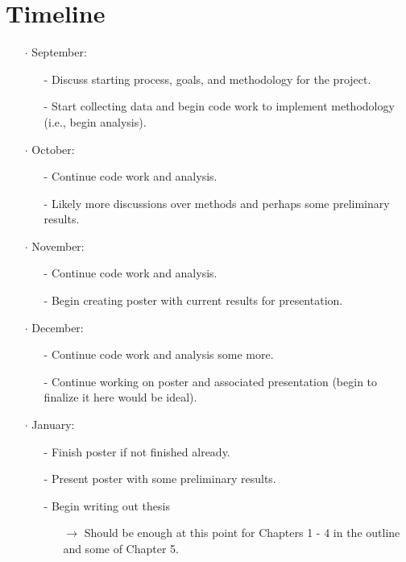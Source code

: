 \documentclass[12pt, letterpaper]{article}
\begin{document}
  \section{Timeline}
  \begin{itemize}
    \item[$\cdot$] September:
    \begin{itemize}
      \item[-] Discuss starting process, goals, and methodology for the project.
      \item[-] Start collecting data and begin code work to implement methodology
               (i.e., begin analysis).\\
    \end{itemize}
    
    \item[$\cdot$] October:
    \begin{itemize}
      \item[-] Continue code work and analysis.
      \item[-] Likely more discussions over methods and perhaps some preliminary results.\\
    \end{itemize}
    
    \item[$\cdot$] November:
    \begin{itemize}
      \item[-] Continue code work and analysis.
      \item[-] Begin creating poster with current results for presentation.\\
    \end{itemize}
    
    \item[$\cdot$] December:
    \begin{itemize}
      \item[-] Continue code work and analysis some more.
      \item[-] Continue working on poster and associated presentation (begin to finalize
               it here would be ideal).\\
    \end{itemize}
    
    \item[$\cdot$] January:
    \begin{itemize}
      \item[-] Finish poster if not finished already.
      \item[-] Present poster with some preliminary results.
      \item[-] Begin writing out thesis
      \begin{itemize}
        \item[$\rightarrow$] Should be enough at this point for Chapters 1 - 4 in the
                             outline and some of Chapter 5.\\
      \end{itemize}
    \end{itemize}
    

\end{itemize}
\end{document}
